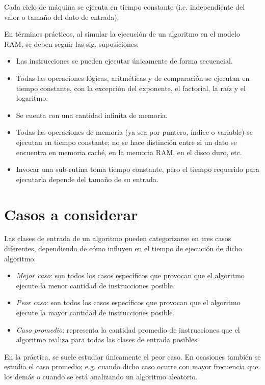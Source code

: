Cada ciclo de máquina se ejecuta en tiempo constante (i.e. independiente
del valor o tamaño del dato de entrada). 

En términos prácticos, al simular la ejecución de un algoritmo en
el modelo RAM, se deben seguir las sig. suposiciones:

\begin{itemize}
    \item Las instrucciones se pueden ejecutar únicamente de forma secuencial. 
    \item Todas las operaciones lógicas, aritméticas y de comparación se ejecutan
    en tiempo constante, con la excepción del exponente, el factorial,
    la raíz y el logaritmo.
    \item Se cuenta con una cantidad infinita de memoria. 
    \item Todas las operaciones de memoria (ya sea por puntero, índice o variable)
    se ejecutan en tiempo constante; no se hace distinción entre si un
    dato se encuentra en memoria caché, en la memoria RAM, en el disco
    duro, etc. 
    \item Invocar una sub-rutina toma tiempo constante, pero el tiempo requerido
    para ejecutarla depende del tamaño de su entrada.
\end{itemize}

\section{Casos a considerar}

Las clases de entrada de un algoritmo pueden categorizarse en tres
casos diferentes, dependiendo de cómo influyen en el tiempo de ejecución
de dicho algoritmo:

\begin{itemize}
    \item \emph{Mejor caso}: son todos los casos específicos que provocan que
    el algoritmo ejecute la menor cantidad de instrucciones posible. 
    \item \emph{Peor caso}: son todos los casos específicos que provocan que
    el algoritmo ejecute la mayor cantidad de instrucciones posible. 
    \item \emph{Caso promedio}: representa la cantidad promedio de instrucciones
    que el algoritmo realiza para todas las clases de entrada posibles. 
\end{itemize}

En la práctica, se suele estudiar únicamente el peor caso. En ocasiones
también se estudia el caso promedio; e.g. cuando dicho caso
ocurre con mayor frecuencia que los demás o cuando se está analizando
un algoritmo aleatorio. 

